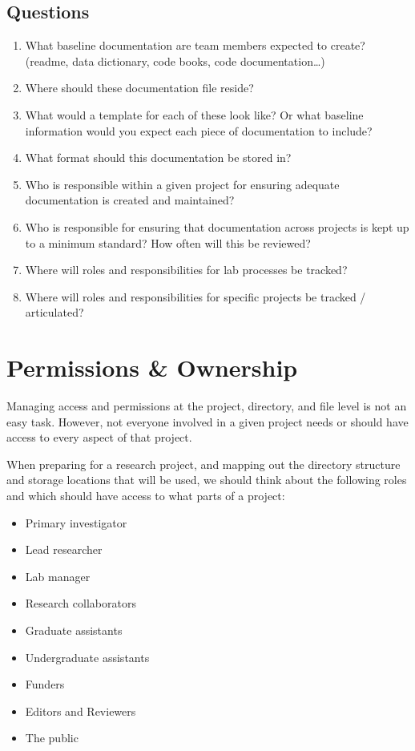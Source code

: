 \documentclass[
]{book}
\providecommand{\tightlist}{%
  \setlength{\itemsep}{0pt}\setlength{\parskip}{0pt}}
\begin{document}
\hypertarget{questions-5}{%
\section*{Questions}\label{questions-5}}

\begin{enumerate}
\def\labelenumi{\arabic{enumi}.}
\tightlist
\item
  What baseline documentation are team members expected to create? (readme, data dictionary, code books, code documentation\ldots)
\item
  Where should these documentation file reside?
\item
  What would a template for each of these look like? Or what baseline information would you expect each piece of documentation to include?
\item
  What format should this documentation be stored in?
\item
  Who is responsible within a given project for ensuring adequate documentation is created and maintained?
\item
  Who is responsible for ensuring that documentation across projects is kept up to a minimum standard? How often will this be reviewed?
\item
  Where will roles and responsibilities for lab processes be tracked?
\item
  Where will roles and responsibilities for specific projects be tracked / articulated?
\end{enumerate}

\hypertarget{permissions-ownership-1}{%
\chapter*{Permissions \& Ownership}\label{permissions-ownership-1}}

Managing access and permissions at the project, directory, and file level is not an easy task. However, not everyone involved in a given project needs or should have access to every aspect of that project.

When preparing for a research project, and mapping out the directory structure and storage locations that will be used, we should think about the following roles and which should have access to what parts of a project:

\begin{itemize}
\tightlist
\item
  Primary investigator
\item
  Lead researcher
\item
  Lab manager
\item
  Research collaborators
\item
  Graduate assistants
\item
  Undergraduate assistants
\item
  Funders
\item
  Editors and Reviewers
\item
  The public
\end{itemize}
\end{document}
